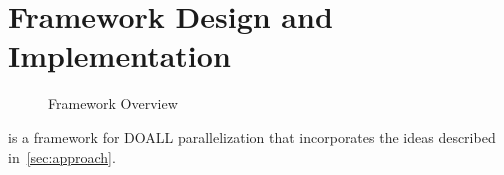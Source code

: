 \section{Framework Design and Implementation}

\begin{figure}[htp]
\centering
  \caption{\name Framework Overview}
  \label{fig:compiler-pipeline}

\end{figure}

%
\name is a framework for DOALL parallelization that incorporates the
ideas described in~\cref{sec:approach}.


